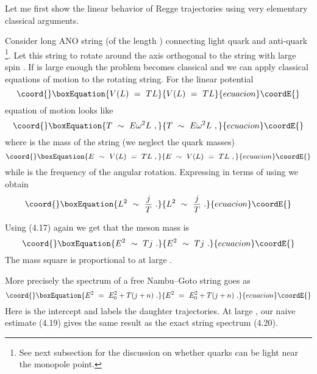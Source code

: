 \documentclass[a4paper,12pt]{article}
\begin{document}
Let me first show the linear behavior of Regge trajectories
using very elementary classical arguments.

Consider long ANO string (of the length \coordHE{}) connecting light
quark and anti-quark \footnote{See next subsection for the
discussion on whether quarks can be light near the monopole
point.}. Let this string to rotate around the axis
orthogonal to the string with large spin \coordHE{}. If \coordHE{} is large
enough the problem becomes classical and we can apply classical
equations of motion to the rotating string. For the linear
potential
\begin{equation}\coord{}\boxEquation{
V(L)\ =\ TL
}{
V(L)\ =\ TL
}{ecuacion}\coordE{}\end{equation}
equation of motion looks like
\begin{equation}\coord{}\boxEquation{
T\ \sim\ E\omega^2L\ ,
}{
T\ \sim\ E\omega^2L\ ,
}{ecuacion}\coordE{}\end{equation}
where \coordHE{} is the mass of the string (we neglect the quark
masses)
\begin{equation}\coord{}\boxEquation{
E\ \sim\ V(L)\ =\ TL\ ,
}{
E\ \sim\ V(L)\ =\ TL\ ,
}{ecuacion}\coordE{}\end{equation}
while \myHighlight{$\omega$}\coordHE{} is the frequency of the angular rotation.
Expressing \myHighlight{$\omega$}\coordHE{} in terms of \coordHE{} using \coordHE{}
we obtain
\begin{equation}\coord{}\boxEquation{
L^2\ \sim\ \frac jT\ .
}{
L^2\ \sim\ \frac jT\ .
}{ecuacion}\coordE{}\end{equation}

Using (4.17) again we get that the meson mass is
\begin{equation}\coord{}\boxEquation{
E^2\ \sim\ Tj\ .
}{
E^2\ \sim\ Tj\ .
}{ecuacion}\coordE{}\end{equation}
The mass square is proportional to \coordHE{} at large \coordHE{}.


More precisely the spectrum of a free Nambu--Goto string goes
as
\begin{equation}\coord{}\boxEquation{
E^2\ =\ E^2_0+T(j+n)\ .
}{
E^2\ =\ E^2_0+T(j+n)\ .
}{ecuacion}\coordE{}\end{equation}
Here \coordHE{} is the intercept and \coordHE{} labels the daughter
trajectories. At large \coordHE{}, \coordHE{} our naive estimate (4.19)
gives the same result as the exact string spectrum (4.20).
\end{document}
